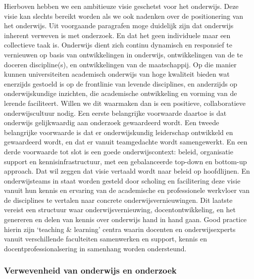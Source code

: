 \documentclass[empirical, authordate, ]{new-jote-article}
\begin{document}
	Hierboven hebben we een ambitieuze visie geschetst voor het onderwijs. Deze visie kan slechts bereikt worden als we ook nadenken over de positionering van het onderwijs. Uit voorgaande paragrafen moge duidelijk zijn dat onderwijs inherent verweven is met onderzoek. En dat het geen individuele maar een collectieve taak is. Onderwijs dient zich continu dynamisch en responsief te vernieuwen op basis van ontwikkelingen in onderwijs, ontwikkelingen van de te doceren discipline(s), en ontwikkelingen van de maatschappij. Op die manier kunnen universiteiten academisch onderwijs van hoge kwaliteit bieden wat enerzijds gestoeld is op de frontlinie van levende disciplines, en anderzijds op onderwijskundige inzichten, die academische ontwikkeling en vorming van de lerende faciliteert. Willen we dit waarmaken dan is een positieve, collaboratieve onderwijscultuur nodig. Een eerste belangrijke voorwaarde daartoe is dat onderwijs gelijkwaardig aan onderzoek gewaardeerd wordt. Een tweede belangrijke voorwaarde is dat er onderwijskundig leiderschap ontwikkeld en gewaardeerd wordt, en dat er vanuit teamgedachte wordt samengewerkt. En een derde voorwaarde tot slot is een goede onderwijscontext: beleid, organisatie support en kennisinfrastructuur, met een gebalanceerde top-down en bottom-up approach. Dat wil zeggen dat visie vertaald wordt naar beleid op hoofdlijnen. En onderwijsteams in staat worden gesteld door scholing en facilitering deze visie vanuit hun kennis en ervaring van de academische en professionele werkvloer van de disciplines te vertalen naar concrete onderwijsvernieuwingen. Dit laatste vereist een structuur waar onderwijsvernieuwing, docentontwikkeling, en het genereren en delen van kennis over onderwijs hand in hand gaan. Good practice hierin zijn ‘teaching \& learning' centra waarin docenten en onderwijsexperts vanuit verschillende faculteiten samenwerken en support, kennis en docentprofessionalsering in samenhang worden ondersteund.



	\subsubsection{Verwevenheid van onderwijs en onderzoek}
\end{document}
